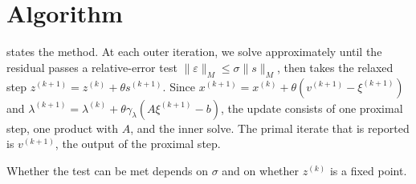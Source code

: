 \documentclass[11pt]{article}
\begin{document}
\section{Algorithm}\label{sec:algorithm}
 states the method.
At each outer iteration, we solve  approximately until the residual passes a relative-error test $\|\varepsilon\|_M \leq \sigma\|s\|_M$, then takes the relaxed step $z^{(k+1)} = z^{(k)} + \theta s^{(k+1)}$.
Since $x^{(k+1)} = x^{(k)} + \theta(v^{(k+1)} - \xi^{(k+1)})$ and $\lambda^{(k+1)} = \lambda^{(k)} + \theta\gamma_\lambda(A\xi^{(k+1)} - b)$, the update consists of one proximal step, one product with $A$, and the inner solve.
The primal iterate that is reported is $v^{(k+1)}$, the output of the proximal step.
\begin{algorithm}[htbp]
    \caption{Relaxed Douglas--Rachford with an inexact linear solve}
    \label{alg:main}
    \KwIn{$z^{(0)} = (x^{(0)}, \lambda^{(0)})$; initial pair $(\xi^{(0)}, \nu^{(0)})$; step sizes $\gamma_x, \gamma_\lambda > 0$; relaxation $\theta \in (0, 2)$; tolerance $\sigma \in [0, (2-\theta)/2)$, stopping tolerance $\delta$, inner batch size $b$}
\end{algorithm}
Whether the test can be met depends on $\sigma$ and on whether $z^{(k)}$ is a fixed point.
\end{document}
